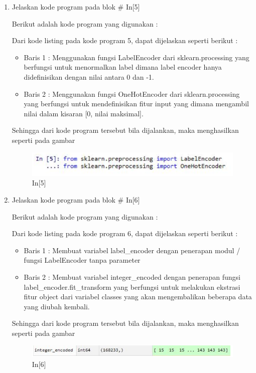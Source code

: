 \begin{enumerate}
\begin{figure}[!htbp]
\end{figure}
\item Jelaskan kode program pada blok \# In[5]
\par Berikut adalah kode program yang digunakan :

\par Dari kode listing pada kode program 5, dapat dijelaskan seperti berikut :
\begin{itemize}
\item Baris 1	: Menggunakan fungsi LabelEncoder dari sklearn.processing yang berfungsi untuk menormalkan label dimana label encoder hanya didefinisikan dengan nilai antara 0 dan -1.
\item Baris 2	: Menggunakan fungsi OneHotEncoder dari sklearn.processing yang berfungsi untuk mendefinisikan fitur input yang dimana mengambil nilai dalam kisaran [0, nilai maksimal].
\end{itemize}
\par Sehingga dari kode program tersebut bila dijalankan, maka menghasilkan seperti pada gambar 
\begin{figure}[!htbp]
	\centerline{\includegraphics[width=1\textwidth]{figures/andi/p5.PNG}}
	\caption{In[5]}
	
\end{figure}
\item Jelaskan kode program pada blok \# In[6]
\par Berikut adalah kode program yang digunakan :

\par Dari kode listing pada kode program 6, dapat dijelaskan seperti berikut :
\begin{itemize}
\item Baris 1	: Membuat variabel label\_encoder dengan penerapan modul / fungsi LabelEncoder tanpa parameter
\item Baris 2	: Membuat variabel integer\_encoded dengan penerapan fungsi label\_encoder.fit\_transform yang berfungsi untuk melakukan ekstrasi fitur object dari variabel classes yang akan mengembalikan beberapa data yang diubah kembali.
\end{itemize}
\par Sehingga dari kode program tersebut bila dijalankan, maka menghasilkan seperti pada gambar 
\begin{figure}[!htbp]
	\centerline{\includegraphics[width=1\textwidth]{figures/andi/p6.PNG}}
	\caption{In[6]}
	

\end{figure}
\end{enumerate}

